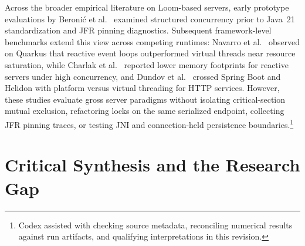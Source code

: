 Across the broader empirical literature on Loom-based servers, early prototype evaluations by Beronić et al.~\cite{Beronivc2021} examined structured concurrency prior to Java~21 standardization and JFR pinning diagnostics. Subsequent framework-level benchmarks extend this view across competing runtimes: Navarro et al.~\cite{Navarro2023} observed on Quarkus that reactive event loops outperformed virtual threads near resource saturation, while Charlak et al.~\cite{Charlak2026} reported lower memory footprints for reactive servers under high concurrency, and Dundov et al.~\cite{SpringHelidon2026} crossed Spring Boot and Helidon with platform versus virtual threading for HTTP services. However, these studies evaluate gross server paradigms without isolating critical-section mutual exclusion, refactoring locks on the same serialized endpoint, collecting JFR pinning traces, or testing JNI and connection-held persistence boundaries.\footnote{Codex assisted with checking source metadata, reconciling numerical results against run artifacts, and qualifying interpretations in this revision.}

\section{Critical Synthesis and the Research Gap}
\label{sec:critical-synthesis}

